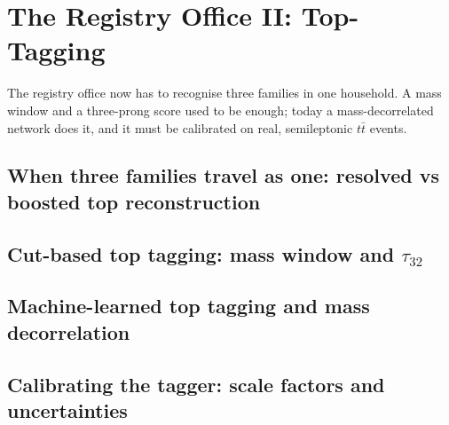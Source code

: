 \chapter{The Registry Office II: Top-Tagging}
\label{ch:registry_office_top}

\begin{journeybox}
The registry office now has to recognise three families in one household. A mass
window and a three-prong score used to be enough; today a mass-decorrelated
network does it, and it must be calibrated on real, semileptonic $t\bar t$
events.
\end{journeybox}


\section{When three families travel as one: resolved vs boosted top reconstruction}
\label{sec:registry_office_top:when_three_families_travel_as_one_resolv}

\section{Cut-based top tagging: mass window and $\tau_{32}$}
\label{sec:registry_office_top:cut_based_top_tagging_mass_window_and_ta}

\section{Machine-learned top tagging and mass decorrelation}
\label{sec:registry_office_top:machine_learned_top_tagging_and_mass_dec}

\section{Calibrating the tagger: scale factors and uncertainties}
\label{sec:registry_office_top:calibrating_the_tagger_scale_factors_and}

